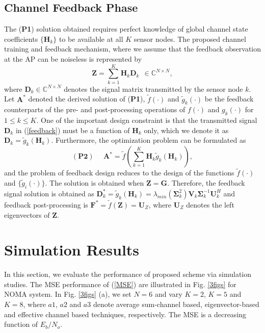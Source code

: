 \documentclass[journal]{IEEEtran}
\theoremstyle{definition}
\begin{document}
 \subsection{Channel Feedback Phase}
  The (\textbf{P1}) solution obtained requires perfect knowledge of global channel state coefficients $\{\mathbf{H}_k\}$ to be available at all $K$ sensor nodes. The proposed channel training and feedback mechanism, where we assume that the feedback observation at the AP can be noiseless is represented by  \vspace{-0.1cm}
 \begin{equation}
 \label{feedback}
 \mathbf{Z} =  \sum_{k =1}^K \mathbf{H}_k \mathbf{D}_k \: \: \in \mathbb{C}^{N \times N},
 \end{equation}\vspace{-0.1cm}
 \noindent where $\mathbf{D}_k\in \mathbb{C}^{N \times N}$ denotes the signal matrix transmitted by the sensor node $k$. Let $\mathbf{A}^*$ denoted the derived solution of (\textbf{P1}), $\tilde{f}(\cdot)$ and $\tilde{g}_k(\cdot)$ be the feedback counterparts of the pre- and post-processing operations of ${f}(\cdot)$ and ${g}_k(\cdot)$ for $1 \leq k \leq K$. One of the important design constraint is that the transmitted signal $\mathbf{D}_k$ in (\ref{feedback}) must be a function of $\mathbf{H}_k$ only, which we denote it as $\mathbf{D}_k = \tilde{g}_k(\mathbf{H}_k) $. Furthermore, the optimization problem can be formulated as\vspace{-0.1cm}
 \begin{equation} 
(\textbf{P2}) \: \: \:  \: \: \: \mathbf{A}^* = \tilde{f}(\sum_{k = 1}^K \mathbf{H}_k \tilde{g}_k(\mathbf{H}_k)),
 \end{equation}\vspace{-0.1cm}
 \noindent and the problem of feedback design reduces to the design of the functions $\tilde{f}(\cdot)$ and $\{\tilde{g}_i(\cdot)\}$. The solution is obtained when $\mathbf{Z} = \mathbf{G}$. Therefore, the feedback signal solution is obtained as $\mathbf{D}_k^* = \tilde{g}_k(\mathbf{H}_k) = \lambda_{min}(\mathbf{\Sigma}_k^2)\mathbf{V}_k \mathbf{\Sigma}_k^{-1} \mathbf{U}_k^H$ and feedback post-processing is $\mathbf{F}^* = \tilde{f}(\mathbf{Z}) = \mathbf{U}_Z$, where $\mathbf{U}_Z$ denotes the left eigenvectors of $\mathbf{Z}$. 
 \section{Simulation Results}
 \label{simulations}
 In this section, we evaluate the performance of proposed scheme via simulation studies. The MSE performance of (\ref{MSE}) are illustrated in Fig. \ref{3figs} for NOMA system. In Fig. \ref{3figs} (a), we set $N=6$ and vary $K=2$, $K=5$ and $K=8$, where $a1$, $a2$ and $a3$ denote average sum-channel based, eigenvector-based and effective channel based techniques, respectively. The MSE is a decreasing function of $E_b/N_o$. 
 
\end{document}
